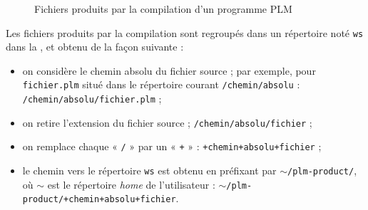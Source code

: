 \begin{figure}[ht]
  \caption{Fichiers produits par la compilation d'un programme PLM}
  \ligne
\end{figure}



Les fichiers produits par la compilation sont regroupés dans un répertoire noté \texttt{ws} dans la , et obtenu de la façon suivante :
\begin{itemize}
  \item on considère le chemin absolu du fichier source ; par exemple, pour {\tt f{}ichier.plm} situé dans le répertoire courant \texttt{/chemin/absolu} : \colorbox{gray!25}{\tt/chemin/absolu/f{}ichier.plm} ;
  \item on retire l'extension du fichier source ; \colorbox{gray!25}{\tt/chemin/absolu/f{}ichier} ;
  \item on remplace chaque « \texttt{/} » par un « \texttt{+} » : \colorbox{gray!25}{\tt+chemin+absolu+f{}ichier} ;
  \item le chemin vers le répertoire \texttt{ws} est obtenu en préfixant par \texttt{$\sim$/plm-product/}, où $\sim$ est le répertoire \emph{home} de l'utilisateur : \colorbox{gray!25}{\tt$\sim$/plm-product/+chemin+absolu+f{}ichier}.
\end{itemize}


